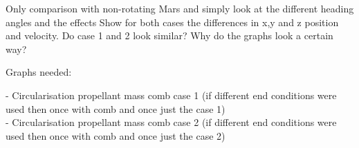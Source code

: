 Only comparison with non-rotating Mars and simply look at the different heading angles and the effects
Show for both cases the differences in x,y and z position and velocity. Do case 1 and 2 look similar? Why do the graphs look a certain way?

Graphs needed:


- Circularisation propellant mass comb case 1 (if different end conditions were used then once with comb and once just the case 1) \\
- Circularisation propellant mass comb case 2 (if different end conditions were used then once with comb and once just the case 2) \\



